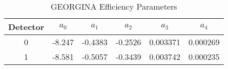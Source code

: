 \begin{table}[]
    \centering
    \caption{GEORGINA Efficiency Parameters}
    \begin{tabular}{c|c|c|c|c|c}
        \toprule
        Detector & $a_0$ & $a_1$ & $a_2$ & $a_3$ & $a_4$ \\
        \hline
        0 & -8.247 & -0.4383 & -0.2526 & 0.003371 & 0.000269  \\
        1 & -8.581 & -0.5057 & -0.3439 & 0.003742 & 0.000235 \\
        \bottomrule
    \end{tabular}
    \label{tab:georgina_eff}
\end{table}